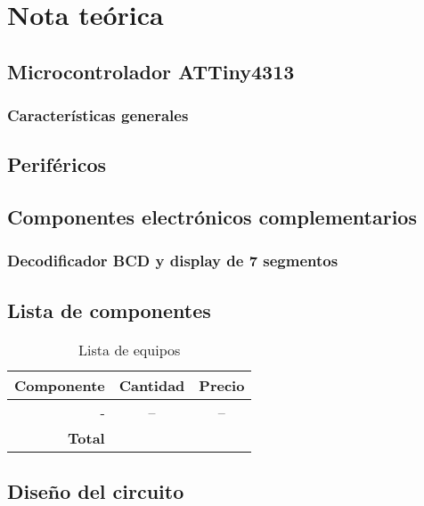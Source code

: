 \section{Nota teórica}
\subsection*{Microcontrolador ATTiny4313}
\subsubsection*{Características generales}

\subsection*{Periféricos}
\subsection*{Componentes electrónicos complementarios}
\subsubsection*{Decodificador BCD y display de 7 segmentos}
    
\subsection*{Lista de componentes}

\begin{table}[H]
\caption{Lista de equipos}
\label{table_2}
\begin{center}
\begin{tabular}{r|cc}
\hline
\textbf{Componente}&\textbf{Cantidad}&\textbf{Precio}\\
 \hline
-&--  &-- \\ \hline 
 \textbf{Total}& &  \\
 \hline
\end{tabular}
\end{center}
\end{table}

\subsection*{Diseño del circuito}
\newpage
